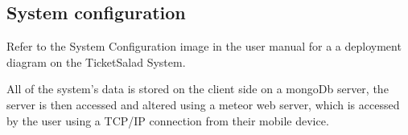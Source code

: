 \documentclass[11pt]{article}
\begin{document}
	\subsection{System configuration}
	Refer to the System Configuration image in the user manual for a a deployment diagram on the TicketSalad System. 
	
	All of the system's data is stored on the client side on a mongoDb server, the server is then accessed and altered using a meteor web server, which is accessed by the user using a TCP/IP connection from their mobile device.
	
	
\end{document}
